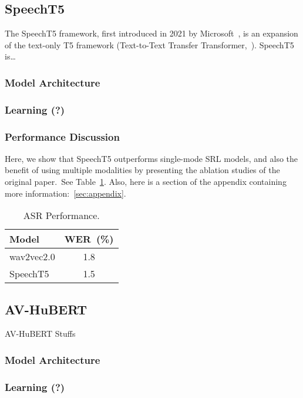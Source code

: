 \documentclass[11pt]{article}
\begin{document}
\subsection{SpeechT5}

The SpeechT5 framework, first introduced in 2021 by Microsoft~\cite{speecht5}, is an expansion of the text-only T5 framework (Text-to-Text Transfer Transformer,~). SpeechT5 is\dots

\subsubsection{Model Architecture}
\subsubsection{Learning (?)}
\subsubsection{Performance Discussion}

Here, we show that SpeechT5 outperforms single-mode SRL models, and also the benefit of using multiple modalities by presenting the ablation studies of the original paper.~See Table~\ref{table:speecht5_performance}. Also, here is a section of the appendix containing more information:~\ref{sec:appendix}.

\begin{table}
    \centering
    \begin{tabular}{lc}
    \hline
    \textbf{Model} & \textbf{WER~(\%)}\\
    \hline
    wav2vec2.0 & 1.8\\
    SpeechT5 & 1.5\\
    \hline
    \end{tabular}
    \caption{\label{table:speecht5_performance}ASR Performance.}
\end{table}

\subsection{AV-HuBERT}

AV-HuBERT Stuffs

\subsubsection{Model Architecture}
\subsubsection{Learning (?)}
\end{document}

